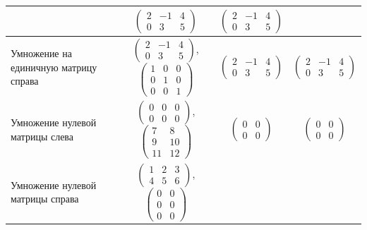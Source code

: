 \documentclass{bmstu}
\begin{document}
\begin{table}[H]
\begin{tabularx}{\textwidth}{|p{3.5cm}|c|C|C|}
		               & $\begin{pmatrix}2&-1&4\\0&3&5\end{pmatrix}$
		               & $\begin{pmatrix}2&-1&4\\0&3&5\end{pmatrix}$                          \\ \hline
		Умножение на единичную матрицу справа
		               & $\begin{pmatrix}2&-1&4\\0&3&5\end{pmatrix}$,
		$\begin{pmatrix}1&0&0\\0&1&0\\0&0&1\end{pmatrix}$
		               & $\begin{pmatrix}2&-1&4\\0&3&5\end{pmatrix}$
		               & $\begin{pmatrix}2&-1&4\\0&3&5\end{pmatrix}$                          \\ \hline
		Умножение нулевой матрицы слева
		               & $\begin{pmatrix}0&0&0\\0&0&0\end{pmatrix}$,
		$\begin{pmatrix}7&8\\9&10\\11&12\end{pmatrix}$
		               & $\begin{pmatrix}0&0\\0&0\end{pmatrix}$
		               & $\begin{pmatrix}0&0\\0&0\end{pmatrix}$                               \\ \hline
		Умножение нулевой матрицы справа
		               & $\begin{pmatrix}1&2&3\\4&5&6\end{pmatrix}$,
		$\begin{pmatrix}0&0\\0&0\\0&0\end{pmatrix}$

\end{tabularx}
\end{table}
\end{document}
